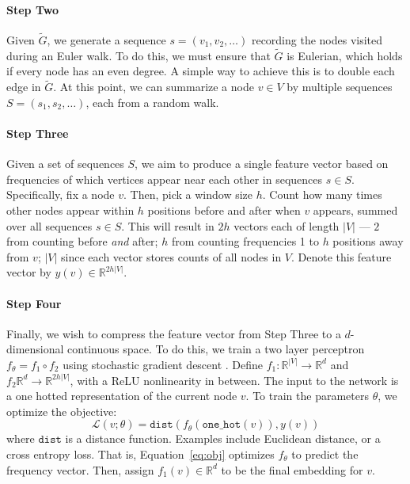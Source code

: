 \documentclass[11pt,a4paper]{article}
\begin{document}
\paragraph{Step Two} Given $\tilde{G}$, we generate a sequence $s = (v_1, v_2, \ldots)$ recording the nodes visited during an Euler walk. To do this, we must ensure that $\tilde{G}$ is Eulerian, which holds if every node has an even degree. A simple way to achieve this is to double each edge in $\tilde{G}$. At this point, we can summarize a node $v \in V$ by multiple sequences $S = (s_1, s_2, \ldots)$, each from a random walk.

\paragraph{Step Three} Given a set of sequences $S$, we aim to produce a single feature vector based on frequencies of which vertices appear near each other in sequences $s \in S$. Specifically, fix a node $v$. Then, pick a window size $h$.
Count how many times other nodes appear within $h$ positions before and after when $v$ appears, summed over all sequences $s \in S$. This will result in $2h$ vectors each of length $|V|$ --- $2$ from counting before \textit{and} after; $h$ from counting frequencies 1 to $h$ positions away from $v$; $|V|$ since each vector stores counts of all nodes in $V$. Denote this feature vector by $y(v) \in \mathbb{R}^{2h|V|}$.

\paragraph{Step Four} Finally, we wish to compress the feature vector from Step Three to a $d$-dimensional continuous space. To do this, we train a two layer perceptron $f_\theta = f_1 \circ f_2$ using stochastic gradient descent \citep{goodfellow2016deep,kingma2014adam}. Define $f_1: \mathbb{R}^{|V|} \rightarrow \mathbb{R}^d$ and $f_2 \mathbb{R}^d \rightarrow \mathbb{R}^{2h|V|}$, with a ReLU nonlinearity in between. The input to the network is a one hotted representation of the current node $v$.
To train the parameters $\theta$, we optimize the objective:
\begin{equation}
  \mathcal{L}(v; \theta) = \texttt{dist}(f_\theta(\texttt{one\_hot}(v)), y(v))
  \label{eq:obj}
\end{equation}
where $\texttt{dist}$ is a distance function. Examples include Euclidean distance, or a cross entropy loss.
That is, Equation~\ref{eq:obj} optimizes $f_\theta$ to predict the frequency vector. Then, assign $f_1(v) \in \mathbb{R}^d$ to be the final embedding for $v$.\newline
\end{document}
